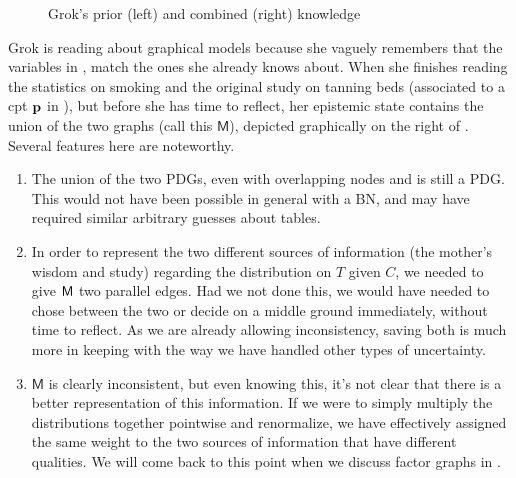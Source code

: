 \documentclass{article}
\newcommand{\sfM}{\mathsf M}
\newcommand{\MN}{PDG}
\newcommand{\MNs}{\MN s}
\numberwithin{equation}{section}
\begin{document}
\begin{example}
\begin{figure}
{
			}
			
			\caption{\small Grok's prior (left) and combined (right) knowledge}
			\label{fig:grok-combine}
		\end{figure}
		
		Grok is reading about graphical models because she vaguely remembers that the variables in , match the ones she already knows about. When she finishes reading the statistics on smoking and the original study on tanning beds (associated to a cpt $\mathbf p$ in ), but before she has time to reflect, her epistemic state contains the union of the two graphs (call this $\sfM$), depicted graphically on the right of .  
		Several features here are noteworthy. 
		\begin{enumerate}[itemsep=0.2em, leftmargin=7pt] %
			\item The union of the two \MNs, even with overlapping nodes and is still a \MN. This would not have been possible in general with a BN, and may have required similar arbitrary guesses about tables. 
				\label{feat:overlap-nodes}
			\item In order to represent the two different sources of information (the mother's wisdom and study) regarding the distribution on $T$ given $C$,  we needed to give $\sf M$ two parallel edges. Had we not done this, we would have needed to chose between the two or decide on a middle ground immediately, without time to reflect. As we are already allowing inconsistency, saving both is much more in keeping with the way we have handled other types of uncertainty.
				\label{feat:overlap-edges}
			\item $\sfM$ is clearly inconsistent, but even knowing this, it's not clear that there is a better representation of this information. If we were to simply multiply the distributions together pointwise and renormalize, we have effectively assigned the same weight to the two sources of information that have different qualities. We will come back to this point when we discuss factor graphs in . 

\end{enumerate}
\end{example}
\end{document}
